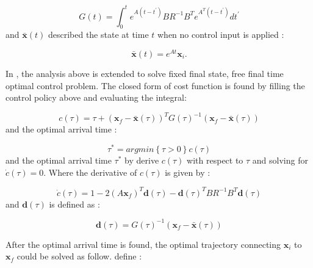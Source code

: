 \documentclass{article}%
\begin{document}
            \begin{equation} \label{gramian_eq}
            G(t)=\int_{0}^{t}e^{A(t-t^{'})}BR^{-1}B^{T}e^{A^{T}(t-t^{'})}dt^{'}
            \end{equation}
            and $\boldsymbol{\bar{x}}(t)$ described the state at time $t$ when no control input is applied :

            \begin{equation} \label{xbar_eq}
            \boldsymbol{\bar{x}}(t) = e^{At}\boldsymbol{x}_{i}.
            \end{equation}

            In \cite{webb2013kinodynamic}, the analysis above is extended to solve fixed final state, free final time optimal control problem. The closed form of cost function is found by filling the control policy above and evaluating the integral:

            \begin{equation} \label{extended_cost_eq}
            c(\tau) = \tau + (\boldsymbol{x}_f - \boldsymbol{\bar{x}}(\tau))^{T}G(\tau)^{-1}(\boldsymbol{x}_f-\boldsymbol{\bar{x}}(\tau))
            \end{equation}
            and the optimal arrival time  :

            \begin{equation} \label{tau_star_eq}
            \tau^{*} = argmin\left \{ \tau > 0 \right \}c(\tau)
            \end{equation}
            and the optimal arrival time $\tau^{*}$ by derive $c(\tau)$ with respect to $\tau$ and solving for $\dot{c}(\tau) = 0$. Where the derivative of $c(\tau)$ is given by :

            \begin{equation} \label{derivative_cost_eq}
            \dot{c}(\tau) = 1 - 2(A\boldsymbol{x}_f)^{T}\boldsymbol{d}(\tau)-\boldsymbol{d}(\tau)^{T}BR^{-1}B^{T}\boldsymbol{d}(\tau)
            \end{equation}
            and $\boldsymbol{d}(\tau)$ is defined as :

            \begin{equation} \label{d_sym_eq}
            \boldsymbol{d}(\tau) = G(\tau)^{-1}(\boldsymbol{x}_f-\boldsymbol{\bar{x}}(\tau))
            \end{equation}

            After the optimal arrival time is found, the optimal trajectory connecting $\boldsymbol{x}_i$ to $\boldsymbol{x}_f$ could be solved as follow. 
            define :
            
\end{document}
